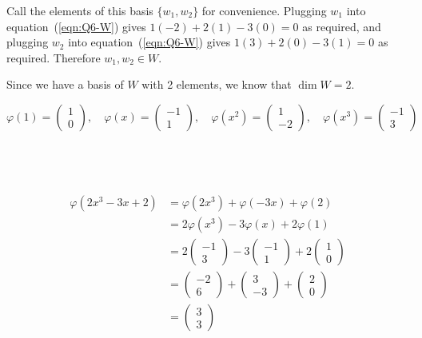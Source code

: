 \documentclass[a4paper]{article}
\begin{document}
Call the elements of this basis $\{ w_1, w_2 \}$ for convenience. Plugging $w_1$ into equation~(\ref{eqn:Q6-W}) gives $1(-2) + 2(1)  - 3(0) = 0$ as required, and plugging $w_2$ into equation~(\ref{eqn:Q6-W}) gives $1(3) + 2(0) - 3(1) = 0$ as required. Therefore $w_1, w_2 \in W$.



Since we have a basis of $W$ with 2 elements, we know that $\dim W = 2$.



$$\varphi(1) = \begin{pmatrix}1\\ 0\end{pmatrix}, \quad \varphi(x) = \begin{pmatrix}-1\\ 1\end{pmatrix}, \quad \varphi(x^2) = \begin{pmatrix}1\\ -2\end{pmatrix}, \quad \varphi(x^3) = \begin{pmatrix}-1\\ 3\end{pmatrix}$$

\subsection{~}

\begin{align*}
\varphi(2x^3 - 3x + 2) &= \varphi(2x^3) + \varphi(-3x) + \varphi(2)\\[1ex]
&= 2 \varphi(x^3) - 3 \varphi(x) + 2 \varphi(1)\\[1ex]
&= 2 \begin{pmatrix}-1\\ 3\end{pmatrix} - 3 \begin{pmatrix}-1\\ 1\end{pmatrix} + 2 \begin{pmatrix}1\\ 0\end{pmatrix}\\[1ex]
&= \begin{pmatrix}-2\\ 6\end{pmatrix} + \begin{pmatrix}3\\ -3\end{pmatrix} + \begin{pmatrix}2\\ 0\end{pmatrix}\\[1ex]
&= \begin{pmatrix}3\\ 3\end{pmatrix}
\end{align*}
\end{document}
